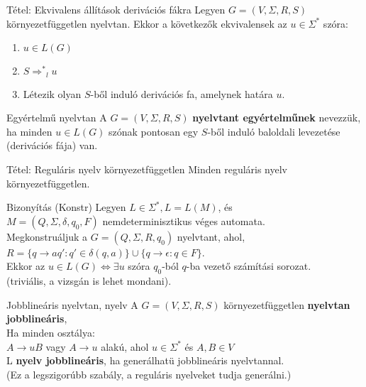 \documentclass{beamer}
\begin{document}
\begin{frame}
\begin{block}{Tétel: Ekvivalens állítások derivációs fákra}
Legyen $G = (V, {\Sigma}, R, S)$ környezetfüggetlen nyelvtan. Ekkor a következők ekvivalensek az $u \in {\Sigma}^*$ szóra:\\
\begin{enumerate}
\item $u \in L(G)$
\item $S {{\Rightarrow}^*}_l u$
\item Létezik olyan $S$-ből induló derivációs fa, amelynek határa $u$.
\end{enumerate}
\end{block}

\end{frame}

\begin{frame}
\begin{block}{Egyértelmű nyelvtan}
A $G = (V, {\Sigma}, R, S)$ \textbf{nyelvtant egyértelműnek} nevezzük, ha minden $u \in L(G)$ szónak pontosan egy $S$-ből induló baloldali levezetése (derivációs fája) van.
\end{block}
\end{frame}

\begin{frame}
\begin{block}{Tétel: Reguláris nyelv környezetfüggetlen}
Minden reguláris nyelv környezetfüggetlen.
\end{block}

\begin{block}{Bizonyítás (Konstr)}
Legyen $L \in {\Sigma}^*, L = L(M)$, és\\
$M = (Q, {\Sigma}, {\delta}, q_0, F)$ nemdeterminisztikus véges automata.\\
\bigskip
Megkonstruáljuk a $G = (Q, {\Sigma}, R, q_0)$ nyelvtant, ahol,\\
$R = \{q \rightarrow aq' : q' \in {\delta}(q, a)\} \cup \{q \rightarrow \epsilon : q \in F \}$.\\
Ekkor az $u \in  L(G) \iff \exists u$ szóra $q_0$-ból $q$-ba vezető számítási sorozat.\\
(triviális, a vizsgán is lehet mondani).
\end{block}

\end{frame}

\begin{frame}
\begin{block}{Jobblineáris nyelvtan, nyelv}
A $G = (V, {\Sigma}, R, S)$ környezetfüggetlen \textbf{nyelvtan jobblineáris},\\
Ha minden osztálya:\\
\medskip
$A \rightarrow uB$ vagy $A \rightarrow u$ alakú, ahol $u \in {\Sigma}^*$ és $A, B \in V$\\
\bigskip
L \textbf{nyelv jobblineáris}, ha generálhatü jobblineáris nyelvtannal.\\
\smallskip
(Ez a legszigorúbb szabály, a reguláris nyelveket tudja generálni.)
\end{block}
\end{frame}
\end{document}
